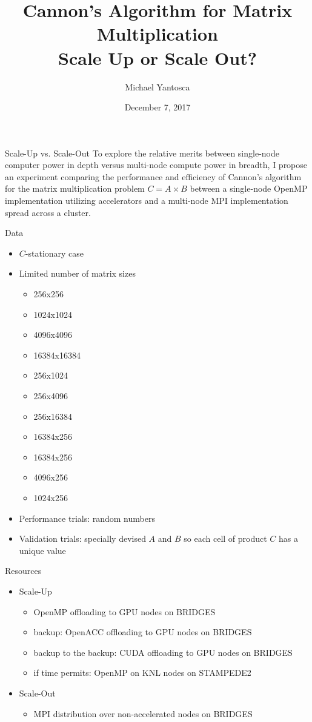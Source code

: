 \documentclass{beamer}
\author{Michael Yantosca}
\institute{University of Houston}
\date{December 7, 2017}
\title[Cannon's Algorithm: Scale-Up vs. Scale-Out]{Cannon's Algorithm for Matrix Multiplication\\Scale Up or Scale Out?}
\begin{document}
\begin{frame}
  \titlepage
\end{frame}
\begin{frame}{Scale-Up vs. Scale-Out}
  To explore the relative merits between single-node computer power in depth versus multi-node compute power in breadth,
  I propose an experiment comparing the performance and efficiency of Cannon's algorithm\autocites{Lecture17Slides,GuptaSadayappan} for the matrix multiplication
  problem $C = A \times B$ between a single-node OpenMP implementation utilizing accelerators and a multi-node MPI
  implementation spread across a cluster.
\end{frame}
\begin{frame}{Data}
  \begin{itemize}
  \item{$C$-stationary case}
  \item{Limited number of matrix sizes}
    \begin{itemize}
    \item{256x256}
    \item{1024x1024}
    \item{4096x4096}
    \item{16384x16384}
    \item{256x1024}
    \item{256x4096}
    \item{256x16384}
    \item{16384x256}
    \item{16384x256}
    \item{4096x256}
    \item{1024x256}
    \end{itemize}
  \item{Performance trials: random numbers}
  \item{Validation trials: specially devised $A$ and $B$ so each cell of product $C$ has a unique value}
  \end{itemize}
\end{frame}
\begin{frame}{Resources}
  \begin{itemize}
  \item{Scale-Up}
    \begin{itemize}
    \item{OpenMP offloading to GPU nodes on BRIDGES}
    \item{backup: OpenACC offloading to GPU nodes on BRIDGES}
    \item{backup to the backup: CUDA offloading to GPU nodes on BRIDGES}
    \item{if time permits: OpenMP on KNL nodes on STAMPEDE2}
    \end{itemize}
  \item{Scale-Out}
    \begin{itemize}
    \item{MPI distribution over non-accelerated nodes on BRIDGES}
    \end{itemize}
  \end{itemize}
\end{frame}
\end{document}
